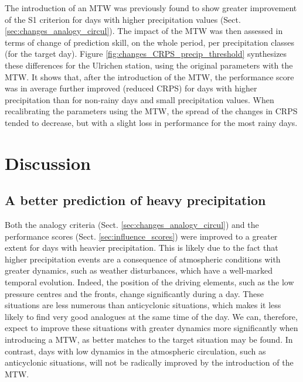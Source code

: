 \documentclass[hess, manuscript]{copernicus}
\begin{document}
	The introduction of an MTW was previously found to show greater improvement of the S1 criterion for days with higher precipitation values (Sect. \ref{sec:changes_analogy_circul}). The impact of the MTW was then assessed in terms of change of prediction skill, on the whole period, per precipitation classes (for the target day). Figure \ref{fig:changes_CRPS_precip_threshold} synthesizes these differences for the Ulrichen station, using the original parameters with the MTW. It shows that, after the introduction of the MTW, the performance score was in average further improved (reduced CRPS) for days with higher precipitation than for non-rainy days and small precipitation values. When recalibrating the parameters using the MTW, the spread of the changes in CRPS tended to decrease, but with a slight loss in performance for the most rainy days.
	

	\section{Discussion}
	\label{sec:discussion}

	\subsection{A better prediction of heavy precipitation}
	
	Both the analogy criteria (Sect. \ref{sec:changes_analogy_circul}) and the performance scores (Sect. \ref{sec:influence_scores}) were improved to a greater extent for days with heavier precipitation. This is likely due to the fact that higher precipitation events are a consequence of atmospheric conditions with greater dynamics, such as weather disturbances, which have a well-marked temporal evolution. Indeed, the position of the driving elements, such as the low pressure centres and the fronts, change significantly during a day. These situations are less numerous than anticyclonic situations, which makes it less likely to find very good analogues at the same time of the day. We can, therefore, expect to improve these situations with greater dynamics more significantly when introducing a MTW, as better matches to the target situation may be found. In contrast, days with low dynamics in the atmospheric circulation, such as anticyclonic situations, will not be radically improved by the introduction of the MTW.
	
\end{document}
